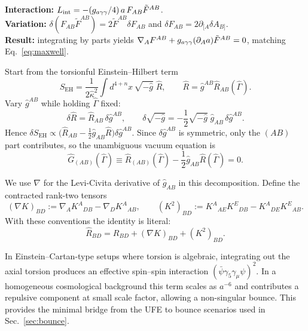 \begin{tcolorbox}[colback=gray!5, colframe=gray!60,
title={\textbf{On-page variation for the axion--Maxwell term}}, fonttitle=\bfseries\small]
\textbf{Interaction:} $L_{\mathrm{int}}=-(g_{a\gamma\gamma}/4)\,a\,F_{AB}\tilde{F}^{AB}$. \\
\textbf{Variation:} $\delta(F_{AB}\tilde{F}^{AB})=2\tilde{F}^{AB}\delta F_{AB}$ and $\delta F_{AB}=2\partial_{[A}\delta A_{B]}$. \\
\textbf{Result:} integrating by parts yields $\nabla_A F^{AB}+g_{a\gamma\gamma}(\partial_A a)\tilde{F}^{AB}=0$,
matching Eq.~\eqref{eq:maxwell}.
\end{tcolorbox}

\begin{tcolorbox}[colback=gray!5, colframe=gray!60,
title={\textbf{Why the UFE uses the symmetric torsionful Einstein tensor}}, fonttitle=\bfseries\small]
Start from the torsionful Einstein--Hilbert term
\[
S_{\mathrm{EH}}=\frac{1}{2\hat{\kappa}^2}\int d^{4+n}x\,\sqrt{-\hat{g}}\;\hat{R},
\qquad
\hat{R}=\hat{g}^{AB}\hat{R}_{AB}(\hat{\Gamma}).
\]
Vary $\hat{g}^{AB}$ while holding $\hat{\Gamma}$ fixed:
\[
\delta\hat{R}=\hat{R}_{AB}\,\delta\hat{g}^{AB},
\qquad
\delta\sqrt{-\hat{g}}=-\frac12\sqrt{-\hat{g}}\;\hat{g}_{AB}\,\delta\hat{g}^{AB}.
\]
Hence $\delta S_{\mathrm{EH}}\propto\bigl(\hat{R}_{AB}-\tfrac12\hat{g}_{AB}\hat{R}\bigr)\delta\hat{g}^{AB}$.
Since $\delta\hat{g}^{AB}$ is symmetric, only the $(AB)$ part contributes, so the unambiguous vacuum equation is
\[
\hat{G}_{(AB)}(\hat{\Gamma})\equiv \hat{R}_{(AB)}(\hat{\Gamma})-\frac12\hat{g}_{AB}\hat{R}(\hat{\Gamma})=0.
\]
\end{tcolorbox}

\begin{tcolorbox}[colback=gray!5, colframe=gray!60,
title={\textbf{Notation: Ricci tensor under }\(\hat{\Gamma}=\Gamma(\hat{g})+K\)}, fonttitle=\bfseries\small]
We use $\nabla$ for the Levi-Civita derivative of $\hat{g}_{AB}$ in this decomposition.
Define the contracted rank-two tensors
\[
(\nabla K)_{BD}:=\nabla_A K^A{}_{DB}-\nabla_D K^A{}_{AB},
\qquad
(K^2)_{BD}:=K^A{}_{AE}K^E{}_{DB}-K^A{}_{DE}K^E{}_{AB}.
\]
With these conventions the identity is literal:
\[
\hat{R}_{BD}=R_{BD}+(\nabla K)_{BD}+(K^2)_{BD}.
\]
\end{tcolorbox}

\begin{tcolorbox}[colback=blue!3, colframe=blue!40,
    title={\textbf{Lemma (Torsion-Induced Bounce Term)}}, fonttitle=\bfseries\small]
In Einstein--Cartan-type setups where torsion is algebraic, integrating out the
axial torsion produces an effective spin--spin interaction
$(\bar{\psi}\gamma_5\gamma_\mu\psi)^2$. In a homogeneous cosmological background this term
scales as $a^{-6}$ and contributes a repulsive component at small scale factor,
allowing a non-singular bounce. This provides the minimal bridge from the UFE to
bounce scenarios used in Sec.~\ref{sec:bounce}.
\end{tcolorbox}

